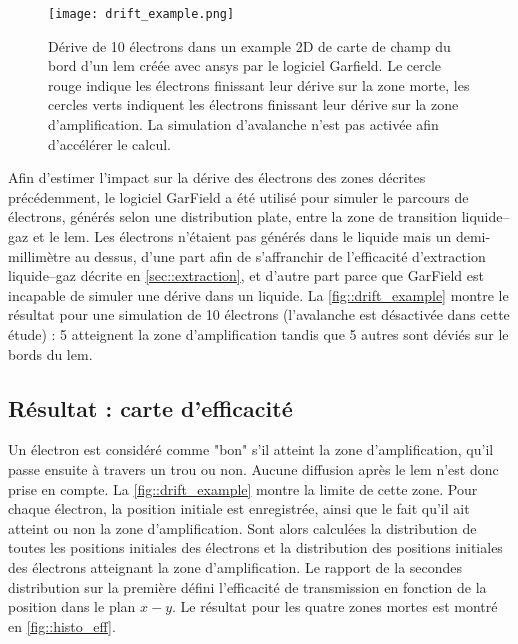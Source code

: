         \begin{figure}[!htb]
          \centering
          \texttt{[image: drift\_example.png]}
          \caption[Dérive de 10 électrons dans la carte de champ du bord d'un LEM avec Garfield]{Dérive de 10 électrons dans un example 2D de carte de champ du bord d'un \gls{lem} créée avec \gls{ansys} par le logiciel Garfield. Le cercle rouge indique les électrons finissant leur dérive sur la zone morte, les cercles verts indiquent les électrons finissant leur dérive sur la zone d'amplification. La simulation d'avalanche n'est pas activée afin d'accélérer le calcul.}
          \label{fig::drift_example}
        \end{figure}
                
        Afin d'estimer l'impact sur la dérive des électrons des zones décrites précédemment, le logiciel GarField \cite{garfield} a été utilisé pour simuler le parcours de  électrons, générés selon une distribution plate, entre la zone de transition liquide--gaz et le \gls{lem}. Les électrons n'étaient pas générés dans le liquide mais un demi-millimètre au dessus, d'une part afin de s'affranchir de l'efficacité d'extraction liquide--gaz décrite en \autoref{sec::extraction}, et d'autre part parce que GarField est incapable de simuler une dérive dans un liquide. La \autoref{fig::drift_example} montre le résultat pour une simulation de 10 électrons (l'avalanche est désactivée dans cette étude) : 5 atteignent la zone d'amplification tandis que 5 autres sont déviés sur le bords du \gls{lem}.
                
    \subsection{Résultat : carte d'efficacité}
        
      Un électron est considéré comme "bon" s'il atteint la zone d'amplification, qu'il passe ensuite à travers un trou ou non. Aucune diffusion après le \gls{lem} n'est donc prise en compte. La \autoref{fig::drift_example} montre la limite de cette zone. Pour chaque électron, la position initiale est enregistrée, ainsi que le fait qu'il ait atteint ou non la zone d'amplification. Sont alors calculées la distribution de toutes les positions initiales des électrons et la distribution des positions initiales des électrons atteignant la zone d'amplification. Le rapport de la secondes distribution sur la première défini l'efficacité de transmission en fonction de la position dans le plan $x-y$. Le résultat pour les quatre zones mortes est montré en \autoref{fig::histo_eff}.
            
